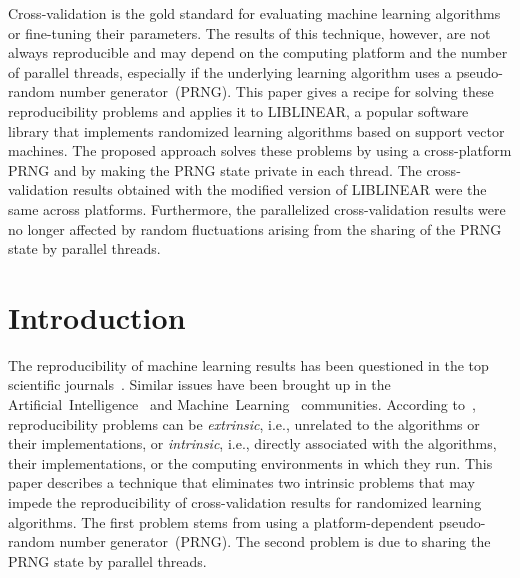 \usetikzlibrary{arrows,calc,fit,matrix,positioning}

\newcommand{\CC}{C++}

Cross-validation is the gold standard for evaluating machine learning
algorithms or fine-tuning their parameters.
The results of this technique, however, are not always reproducible and may
depend on the computing platform and the number of parallel threads,
especially if the underlying learning algorithm uses a pseudo-random number
generator~(PRNG). This paper gives a recipe for solving these reproducibility problems and
applies it to LIBLINEAR\supercite{fan2008liblinear}, a popular software library
that implements randomized learning algorithms based on support vector
machines\supercite{vapnik1998statistical}. The proposed approach solves these
problems by using a cross-platform PRNG and by making the PRNG state private
in each thread. The cross-validation results obtained with the modified
version of LIBLINEAR were the same across platforms. Furthermore, the
parallelized cross-validation results were no longer affected by random
fluctuations arising from the sharing of the PRNG state by parallel threads.


\section{Introduction}


The reproducibility of machine learning results has been questioned in the top
scientific journals~\supercite{%
  barnes2010publish,
  peng2011reproducible,
  ince2012case,
  hutson2018artificial}. Similar issues have been brought up in the
Artificial~Intelligence~\supercite{henderson2017deep,gundersen2018state} and
Machine~Learning~\supercite{sculley2015hidden} communities.
According to~\citet{henderson2017deep}, reproducibility problems can be
\emph{extrinsic}, i.e., unrelated to the algorithms or their implementations,
or \emph{intrinsic}, i.e., directly associated with the algorithms, their
implementations, or the computing environments in which they run. This paper
describes a technique that eliminates two intrinsic problems that may impede
the reproducibility of cross-validation results for randomized learning algorithms.
The first problem stems from using a platform-dependent pseudo-random number
generator~(PRNG). The second problem is due to sharing the PRNG state by
parallel threads.

